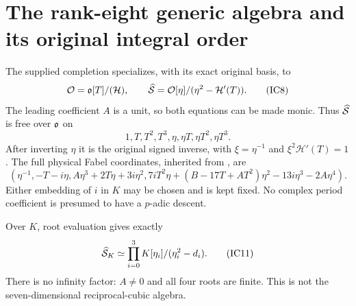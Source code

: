 \section{The rank-eight generic algebra and its original integral order}
The supplied completion specializes, with its exact original basis, to
\[
 \mathcal O=\mathfrak o[T]/(\mathcal H),\qquad
 \widehat{\mathcal S}=\mathcal O[\eta]/(\eta^2-\mathcal H'(T)).                 \tag{IC8}
\]
The leading coefficient $A$ is a unit, so both equations can be made monic.
Thus $\widehat{\mathcal S}$ is free over $\mathfrak o$ on
\[
 1,T,T^2,T^3,\eta,\eta T,\eta T^2,\eta T^3.             \tag{IC9}
\]
After inverting $\eta$ it is the original signed inverse, with
$\xi=\eta^{-1}$ and $\xi^2\mathcal H'(T)=1$.
The full physical Fabel coordinates, inherited from \cite[equation (21)]{Input}, are
\[
 \left(\eta^{-1},-T-i\eta,
 A\eta^3+2T\eta+3i\eta^2,
 7iT^2\eta+(B-17T+AT^2)\eta^2-13i\eta^3-2A\eta^4\right).       \tag{IC10}
\]
Either embedding of $i$ in $K$ may be chosen and is kept fixed. No complex
period coefficient is presumed to have a $p$-adic descent.

Over $K$, root evaluation gives exactly
\[
 \widehat{\mathcal S}_K\simeq\prod_{i=0}^3K[\eta_i]/(\eta_i^2-d_i).     \tag{IC11}
\]
There is no infinity factor: $A\ne0$ and all four roots are finite.
This is not the seven-dimensional reciprocal-cubic algebra.

